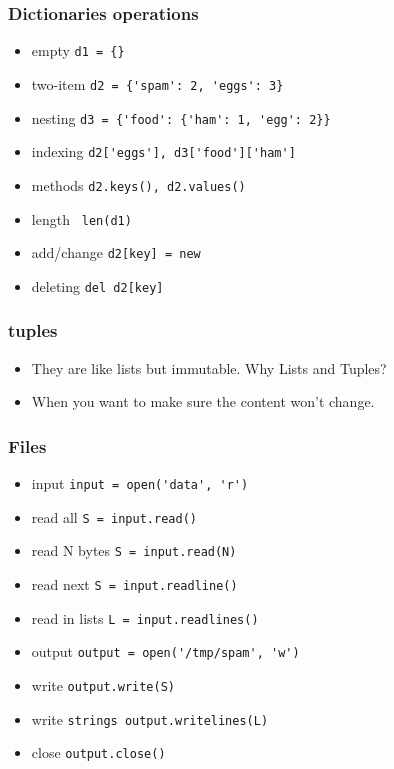 \begin{frame}[fragile]\frametitle{Dictionaries operations}
  \begin{itemize}
  \item empty  \lstinline|d1 = {}|
  \item two-item \lstinline|d2 = {'spam': 2, 'eggs': 3}|
  \item nesting \lstinline|d3 = {'food': {'ham': 1, 'egg': 2}}|
  \item indexing \lstinline|d2['eggs'], d3['food']['ham']|
  \item methods \lstinline|d2.keys(), d2.values()|
  \item length \lstinline| len(d1)|
  \item add/change \lstinline|d2[key] = new|
  \item deleting \lstinline|del d2[key]|
  \end{itemize}
\end{frame}

\begin{frame}[fragile]\frametitle{tuples}
  \begin{itemize}
  \item They are like lists but immutable. Why Lists and Tuples?
  \item When you want to make sure the content won't change.
  \end{itemize}
\end{frame}

\begin{frame}[fragile]\frametitle{Files}
  \begin{itemize}
  \item input \lstinline{input = open('data', 'r')}
  \item read all \lstinline{S = input.read()}
  \item read N bytes \lstinline{S = input.read(N)}
  \item read next \lstinline{S = input.readline()}
  \item read in lists \lstinline{L = input.readlines()}
  \item output \lstinline{output = open('/tmp/spam', 'w')}
  \item write \lstinline{output.write(S)}
  \item write \lstinline{strings output.writelines(L)}
  \item close \lstinline{output.close()}
  \end{itemize}
\end{frame}


